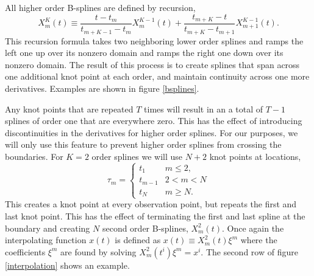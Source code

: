 \documentclass[twocol]{ametsoc}
\begin{document}
All higher order B-splines are defined by recursion,
\begin{equation}
X^K_m(t) \equiv \frac{t - t_m}{t_{m+K-1} - t_m} X^{K-1}_m(t) + \frac{t_{m+K}-t}{t_{m+K} - t_{m+1}} X^{K-1}_{m+1}(t).
\end{equation}
This recursion formula takes two neighboring lower order splines and ramps the left one up over its nonzero domain and ramps the right one down over its nonzero domain. The result of this process is to create splines that span across one additional knot point at each order, and maintain continuity across one more derivatives. Examples are shown in figure \ref{bsplines}.

Any knot points that are repeated $T$ times will result in an a total of $T-1$ splines of order one that are everywhere zero. This has the effect of introducing discontinuities in the derivatives for higher order splines. For our purposes, we will only use this feature to prevent higher order splines from crossing the boundaries. For $K=2$ order splines we will use $N+2$ knot points at locations,
\begin{equation}
\tau_m = \begin{cases}
t_1      	& \text{$m \leq 2$}, \\
t_{m-1}	& \text{$2 < m < N$}\\
t_N 		& \text{$m \geq N$}.
\end{cases}
\end{equation}
This creates a knot point at every observation point, but repeats the first and last knot point. This has the effect of terminating the first and last spline at the boundary and creating $N$ second order B-splines, $X^2_m(t)$. Once again the interpolating function $x(t)$ is defined as $x(t) \equiv  X^2_m(t) \xi^m$ where the coefficients $\xi^m$ are found by solving $X^2_m(t^i) \xi^m = x^i$. The second row of figure \ref{interpolation} shows an example.
\end{document}
